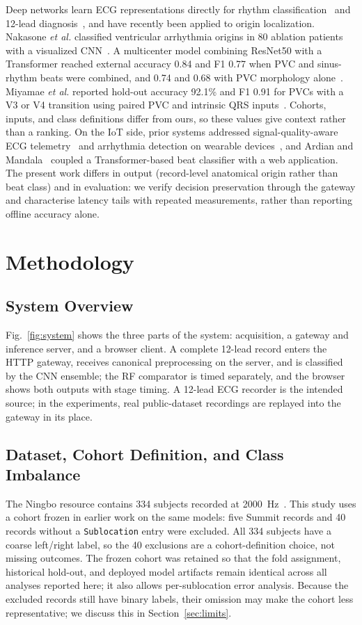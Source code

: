 \documentclass[conference,a4paper]{IEEEtran}
\begin{document}
Deep networks learn ECG representations directly for rhythm classification~\cite{hannun2019} and 12-lead diagnosis~\cite{ribeiro2020}, and have recently been applied to origin localization. Nakasone \emph{et al.} classified ventricular arrhythmia origins in 80 ablation patients with a visualized CNN~\cite{nakasone2022}. A multicenter model combining ResNet50 with a Transformer reached external accuracy 0.84 and F1 0.77 when PVC and sinus-rhythm beats were combined, and 0.74 and 0.68 with PVC morphology alone~\cite{nakasone2024}. Miyamae \emph{et al.} reported hold-out accuracy 92.1\% and F1 0.91 for PVCs with a V3 or V4 transition using paired PVC and intrinsic QRS inputs~\cite{miyamae2026}. Cohorts, inputs, and class definitions differ from ours, so these values give context rather than a ranking. On the IoT side, prior systems addressed signal-quality-aware ECG telemetry~\cite{satija2017} and arrhythmia detection on wearable devices~\cite{azariadi2016}, and Ardian and Mandala~\cite{ardian2025} coupled a Transformer-based beat classifier with a web application. The present work differs in output (record-level anatomical origin rather than beat class) and in evaluation: we verify decision preservation through the gateway and characterise latency tails with repeated measurements, rather than reporting offline accuracy alone.

\section{Methodology}
\subsection{System Overview}
Fig.~\ref{fig:system} shows the three parts of the system: acquisition, a gateway and inference server, and a browser client. A complete 12-lead record enters the HTTP gateway, receives canonical preprocessing on the server, and is classified by the CNN ensemble; the RF comparator is timed separately, and the browser shows both outputs with stage timing. A 12-lead ECG recorder is the intended source; in the experiments, real public-dataset recordings are replayed into the gateway in its place.


\subsection{Dataset, Cohort Definition, and Class Imbalance}
The Ningbo resource contains 334 subjects recorded at 2000~Hz~\cite{zheng2020}. This study uses a cohort frozen in earlier work on the same models: five Summit records and 40 records without a \texttt{Sublocation} entry were excluded. All 334 subjects have a coarse left/right label, so the 40 exclusions are a cohort-definition choice, not missing outcomes. The frozen cohort was retained so that the fold assignment, historical hold-out, and deployed model artifacts remain identical across all analyses reported here; it also allows per-sublocation error analysis. Because the excluded records still have binary labels, their omission may make the cohort less representative; we discuss this in Section~\ref{sec:limits}.
\end{document}
